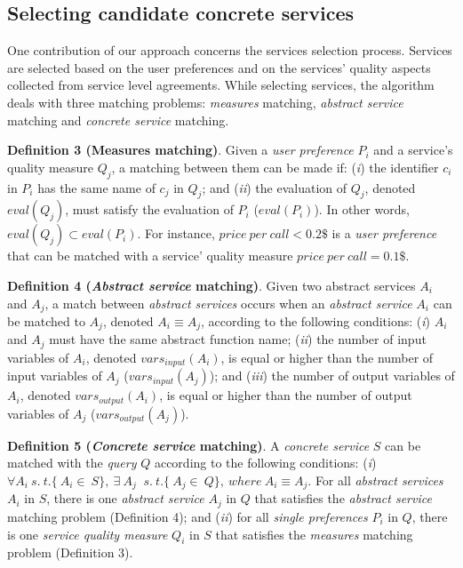 \subsection{Selecting candidate concrete services}

One contribution of our approach concerns the services selection process. Services are selected based on the user preferences and on the services' quality aspects collected from service level agreements.
While selecting services, the algorithm deals with three matching problems: \textit{measures} matching, \textit{abstract service} matching and \textit{concrete service} matching.
\bigskip

\noindent \textbf{Definition 3 (Measures matching)}.
Given a \textit{user preference} $P_{i}$ and a service's quality measure $Q_{j}$, a matching between them can be made if: (\textit{i}) the identifier $c_{i}$ in $P_{i}$ has the same name of $c_{j}$ in $Q_{j}$; and
(\textit{ii}) the evaluation of $Q_{j}$, denoted $eval(Q_{j})$, must satisfy the evaluation of $P_{i}$ ($eval(P_{i})$). In other words, $eval(Q_{j}) \subset eval(P_{i})$. For instance, $price \ per \ call < 0.2\$$ is a \textit{user preference} that can be matched with a service' quality measure $price \ per \ call = 0.1\$$.
\bigskip

\noindent \textbf{Definition 4 (\textit{Abstract service} matching)}.
Given two abstract services $A_{i}$ and $A_{j}$, a match between \textit{abstract services} occurs when an \textit{abstract service} $A_{i}$ can be matched to $A_{j}$, denoted $A_{i} \equiv A_{j}$, according to the following conditions: 
(\textit{i}) $A_{i}$ and $A_{j}$ must have the same abstract function name; 
(\textit{ii}) the number of input variables of $A_{i}$, denoted $vars_{input}(A_{i})$, is equal or higher than the number of input variables of $A_{j}$ ($vars_{input}(A_{j})$); and 
(\textit{iii}) the number of output variables of $A_{i}$, denoted $vars_{output}(A_{i})$, is equal or higher than the number of output variables of $A_{j}$ ($vars_{output}(A_{j})$).
\bigskip

\noindent \textbf{Definition 5 (\textit{Concrete service} matching)}.
A \textit{concrete service} $S$ can be matched with the \textit{query} $Q$ according to the following conditions:
(\textit{i}) $\forall A_{i}  \ s. \ t. \lbrace\ A_{i} \in \ S\rbrace, \ \exists \ A_{j} \ $ $s. \ t. \lbrace\ A_{j} \in \ Q\rbrace, \ where \ A_{i} \equiv A_{j}.$ For all \textit{abstract services} $A_{i}$ in $S$, there is one \textit{abstract service} $A_{j}$ in $Q$ that satisfies the \textit{abstract service} matching problem (Definition 4); and (\textit{ii}) for all \textit{single preferences} $P_{i}$ in $Q$, there is one
\textit{service quality measure} $Q_{i}$ in $S$ that satisfies the \textit{measures} matching problem (Definition 3).


